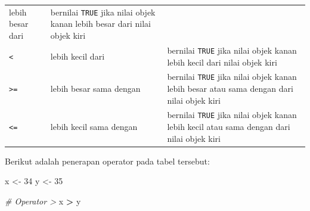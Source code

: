 \documentclass[12pt,]{krantz}
\newenvironment{Shaded}{\begin{snugshade}}{\end{snugshade}}
\newcommand{\CommentTok}[1]{\textcolor[rgb]{0.56,0.35,0.01}{\textit{#1}}}
\newcommand{\DecValTok}[1]{\textcolor[rgb]{0.00,0.00,0.81}{#1}}
\newcommand{\NormalTok}[1]{#1}
\newcommand{\OperatorTok}[1]{\textcolor[rgb]{0.81,0.36,0.00}{\textbf{#1}}}
\newcommand{\StringTok}[1]{\textcolor[rgb]{0.31,0.60,0.02}{#1}}
\begin{document}
\begin{longtable}[]{@{}lll@{}}
\begin{minipage}[t]{0.17\columnwidth}
lebih besar dari\strut
\end{minipage} & \begin{minipage}[t]{0.64\columnwidth}\raggedright
bernilai \texttt{TRUE} jika nilai objek kanan lebih besar dari nilai objek kiri\strut
\end{minipage}\tabularnewline
\begin{minipage}[t]{0.11\columnwidth}\raggedright
\texttt{\textless{}}\strut
\end{minipage} & \begin{minipage}[t]{0.17\columnwidth}\raggedright
lebih kecil dari\strut
\end{minipage} & \begin{minipage}[t]{0.64\columnwidth}\raggedright
bernilai \texttt{TRUE} jika nilai objek kanan lebih kecil dari nilai objek kiri\strut
\end{minipage}\tabularnewline
\begin{minipage}[t]{0.11\columnwidth}\raggedright
\texttt{\textgreater{}=}\strut
\end{minipage} & \begin{minipage}[t]{0.17\columnwidth}\raggedright
lebih besar sama dengan\strut
\end{minipage} & \begin{minipage}[t]{0.64\columnwidth}\raggedright
bernilai \texttt{TRUE} jika nilai objek kanan lebih besar atau sama dengan dari nilai objek kiri\strut
\end{minipage}\tabularnewline
\begin{minipage}[t]{0.11\columnwidth}\raggedright
\texttt{\textless{}=}\strut
\end{minipage} & \begin{minipage}[t]{0.17\columnwidth}\raggedright
lebih kecil sama dengan\strut
\end{minipage} & \begin{minipage}[t]{0.64\columnwidth}\raggedright
bernilai \texttt{TRUE} jika nilai objek kanan lebih kecil atau sama dengan dari nilai objek kiri\strut
\end{minipage}\tabularnewline
\bottomrule
\end{longtable}

Berikut adalah penerapan operator pada tabel tersebut:

\begin{Shaded}
\begin{Highlighting}[]
\NormalTok{x <-}\StringTok{ }\DecValTok{34}
\NormalTok{y <-}\StringTok{ }\DecValTok{35}

\CommentTok{# Operator >}
\NormalTok{x }\OperatorTok{>}\StringTok{ }\NormalTok{y}
\end{Highlighting}
\end{Shaded}
\end{document}
